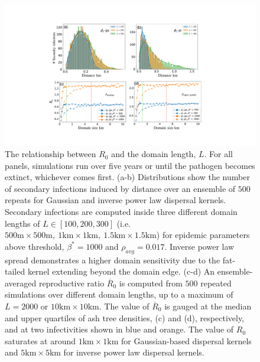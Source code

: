 \begin{figure}
    \centering
    \includegraphics[scale=0.42]{chapter6/figures/fig5-R0-domain-size.pdf}
    \caption{The relationship between $R_0$ and the domain length, $L$. 
    For all panels, simulations run over five years or until the pathogen becomes extinct, whichever comes first.
    (a-b) Distributions show the number of secondary infections induced by distance over an ensemble of $500$ repeats for Gaussian and inverse power law dispersal kernels.
    Secondary infections are computed inside three different domain lengths of $L \in [100, 200, 300]$ (i.e. $\mathrm{500m\times500m,\ 1km\times1km,\ 1.5km\times1.5km}$) for epidemic parameters above threshold, $\beta^*=1000$ and $\rho_{avg} = 0.017$. Inverse power law spread demonstrates a higher domain sensitivity due to the fat-tailed kernel extending beyond the domain edge. (c-d) An ensemble-averaged reproductive ratio $\overline{R}_0$ is computed from $500$ repeated simulations over different domain lengths, up to a maximum of $L=2000$ or $\mathrm{10km \times 10km}$. The value of $\overline{R}_0$ is gauged at the median and upper quartiles of ash tree densities, (c) and (d), respectively, and at two infectivities shown in blue and orange. The value of $R_0$ saturates at around $\mathrm{1km\times1km}$ for Gaussian-based dispersal kernels and $\mathrm{5km\times5 km}$ for inverse power law dispersal kernels.}
    
    \label{fig:r0-domain-size}
\end{figure}

